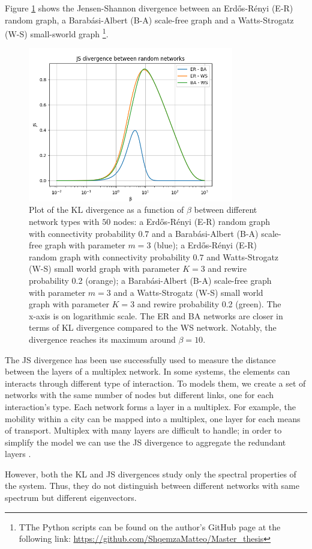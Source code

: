 Figure \ref{Fig:JS_divergence} shows the Jensen-Shannon divergence between an Erd\H{o}s-Rényi (E-R) random graph, a Barab\'asi-Albert (B-A) scale-free graph and a Watts-Strogatz (W-S) small-sworld graph \footnote{TThe Python scripts can be found on the author's GitHub page at the following link: \url{https://github.com/ShqemzaMatteo/Master_thesis}}.

\begin{figure}[ht!]
    \centering
    \includegraphics[width=0.80\textwidth]{image/JS_divergence.png}
    \caption{Plot of the KL divergence as a function of $\beta$ between different network types with $50$ nodes: a Erd\H{o}s-Rényi (E-R) random graph with connectivity probability $0.7$ and a Barab\'asi-Albert (B-A) scale-free graph with parameter $m=3$ (blue); a Erd\H{o}s-Rényi (E-R) random graph with connectivity probability $0.7$ and Watts-Strogatz (W-S) small world graph with parameter $K=3$ and rewire probability 0.2 (orange); a Barab\'asi-Albert (B-A) scale-free graph with parameter $m=3$ and a Watts-Strogatz (W-S) small world graph with parameter $K=3$ and rewire probability 0.2 (green). The x-axis is on logarithmic scale. The ER and BA networks are closer in terms of KL divergence compared to the WS network. Notably, the divergence reaches its maximum around $\beta = 10$.}
    \label{Fig:JS_divergence}
\end{figure}
The JS divergence has been use successfully used to measure the distance between the layers of a multiplex network.
In some systems, the elements can interacts through different type of interaction. To models them, we create a set of networks with the same number of nodes but different links, one for each interaction's type. Each network forms a layer in a multiplex. For example, the mobility within a city can be mapped into a multiplex, one layer for each means of transport. Multiplex with many layers are difficult to handle; in order to simplify the model we can use the JS divergence to aggregate the redundant layers \cite{multilayer}.

However, both the KL and JS divergences study only the spectral properties of the system. Thus, they do not distinguish between different networks with same spectrum but different eigenvectors.
